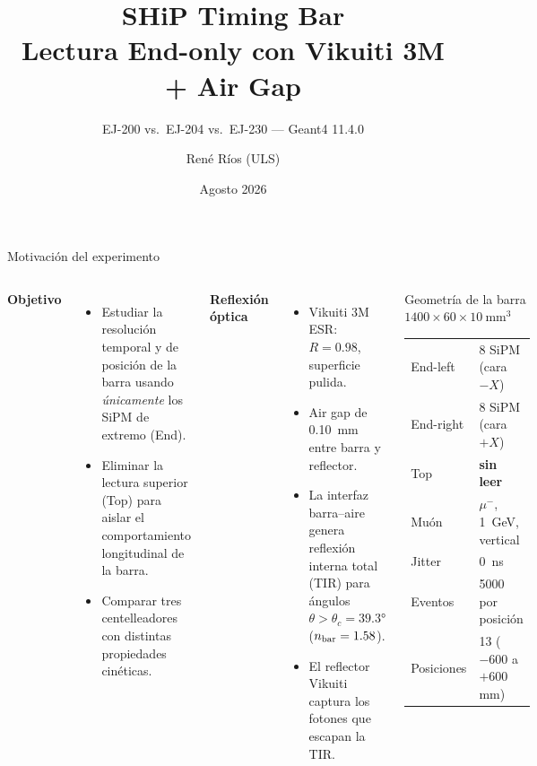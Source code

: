 \documentclass[aspectratio=169,9pt]{beamer}
\title{SHiP Timing Bar\\Lectura End-only con Vikuiti 3M + Air Gap}
\subtitle{EJ-200 vs.\ EJ-204 vs.\ EJ-230 \quad --- \quad Geant4 11.4.0}
\author{René Ríos (ULS)}
\institute{Análisis de simulación interna}
\date{Agosto 2026}
\begin{document}
\begin{frame}
  \titlepage
\end{frame}

\begin{frame}{Motivación del experimento}
  \begin{columns}[T]
    \textbf{Objetivo}
    \begin{itemize}
      \item Estudiar la resolución temporal y de posición de la barra
            usando \textit{únicamente} los SiPM de extremo (End).
      \item Eliminar la lectura superior (Top) para aislar el comportamiento
            longitudinal de la barra.
      \item Comparar tres centelleadores con distintas propiedades cinéticas.
    \end{itemize}
    \vspace{0.4em}
    \textbf{Reflexión óptica}
    \begin{itemize}
      \item Vikuiti 3M ESR: $R = 0.98$, superficie pulida.
      \item \alert{Air gap de \SI{0.10}{mm}} entre barra y reflector.
      \item La interfaz barra--aire genera reflexión interna total (TIR)
            para ángulos $\theta > \theta_c = 39.3°$ ($n_{\rm bar} = 1.58$).
      \item El reflector Vikuiti captura los fotones que escapan la TIR.
    \end{itemize}

    \begin{block}{Geometría de la barra}
      \centering
      $1400 \times 60 \times 10\ \text{mm}^3$\\[0.4em]
      \begin{tabular}{ll}
        End-left  & 8 SiPM (cara $-X$)\\
        End-right & 8 SiPM (cara $+X$)\\
        Top       & \textbf{sin leer}   \\[0.2em]
        Muón      & $\mu^-$, \SI{1}{GeV}, vertical\\
        Jitter    & \SI{0}{ns}\\
        Eventos   & 5000 por posición\\
        Posiciones & 13 ($-600$ a $+600$ mm)\\
      \end{tabular}
    \end{block}
  \end{columns}
\end{frame}
\end{document}
